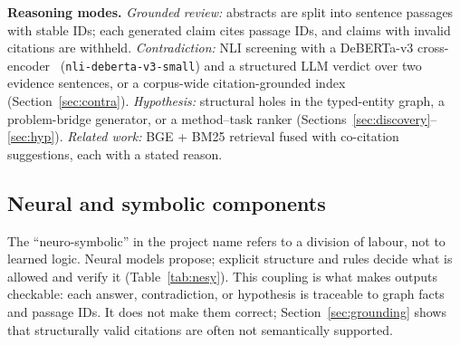 \documentclass[conference]{IEEEtran}
\begin{document}
\textbf{Reasoning modes.} \emph{Grounded review:} abstracts are split into sentence passages with stable IDs; each generated claim cites passage IDs, and claims with invalid citations are withheld. \emph{Contradiction:} NLI screening with a DeBERTa-v3 cross-encoder~\cite{he2023debertav3} (\texttt{nli-deberta-v3-small}) and a structured LLM verdict over two evidence sentences, or a corpus-wide citation-grounded index (Section~\ref{sec:contra}). \emph{Hypothesis:} structural holes in the typed-entity graph, a problem-bridge generator, or a method--task ranker (Sections~\ref{sec:discovery}--\ref{sec:hyp}). \emph{Related work:} BGE + BM25 retrieval fused with co-citation suggestions, each with a stated reason.

\subsection{Neural and symbolic components}
\label{sec:nesy}

The ``neuro-symbolic'' in the project name refers to a division of labour, not to learned logic. Neural models propose; explicit structure and rules decide what is allowed and verify it (Table~\ref{tab:nesy}). This coupling is what makes outputs checkable: each answer, contradiction, or hypothesis is traceable to graph facts and passage IDs. It does not make them correct; Section~\ref{sec:grounding} shows that structurally valid citations are often not semantically supported.
\end{document}
